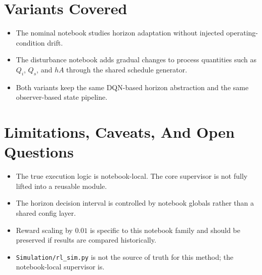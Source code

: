 \documentclass[11pt]{article}
\begin{document}
\section*{Variants Covered}

\begin{itemize}
\item The nominal notebook studies horizon adaptation without injected
      operating-condition drift.
\item The disturbance notebook adds gradual changes to process quantities such
      as $Q_i$, $Q_s$, and $hA$ through the shared schedule generator.
\item Both variants keep the same DQN-based horizon abstraction and the same
      observer-based state pipeline.
\end{itemize}

\section*{Limitations, Caveats, And Open Questions}

\begin{itemize}
\item The true execution logic is notebook-local. The core supervisor is not
      fully lifted into a reusable module.
\item The horizon decision interval is controlled by notebook globals rather
      than a shared config layer.
\item Reward scaling by $0.01$ is specific to this notebook family and should
      be preserved if results are compared historically.
\item \texttt{Simulation/rl\_sim.py} is not the source of truth for this
      method; the notebook-local supervisor is.
\end{itemize}
\end{document}
